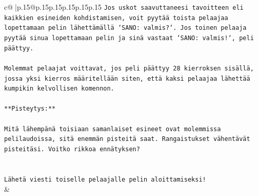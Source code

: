 \documentclass{article}
\begin{document}
{\begin{supertabular}{c@{$\;$}|p{.15\linewidth}@{}p{.15\linewidth}p{.15\linewidth}p{.15\linewidth}p{.15\linewidth}p{.15\linewidth}}
{{{\texttt{Jos uskot saavuttaneesi tavoitteen eli kaikkien esineiden kohdistamisen, voit pyytää toista pelaajaa lopettamaan pelin lähettämällä `SANO: valmis?`. Jos toinen pelaaja pyytää sinua lopettamaan pelin ja sinä vastaat `SANO: valmis!`, peli päättyy.} \\
\\ 
\texttt{Molemmat pelaajat voittavat, jos peli päättyy 28 kierroksen sisällä, jossa yksi kierros määritellään siten, että kaksi pelaajaa lähettää kumpikin kelvollisen komennon.} \\
\\ 
\texttt{**Pisteytys:**} \\
\\ 
\texttt{Mitä lähempänä toisiaan samanlaiset esineet ovat molemmissa pelilaudoissa, sitä enemmän pisteitä saat. Rangaistukset vähentävät pisteitäsi. Voitko rikkoa ennätyksen?} \\
\\ 
\\ 
\texttt{Lähetä viesti toiselle pelaajalle pelin aloittamiseksi!} \\
            }
        }
    }
    & \\ \\


\end{supertabular}}
\end{document}
